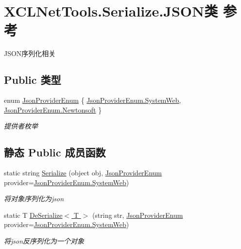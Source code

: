 \hypertarget{class_x_c_l_net_tools_1_1_serialize_1_1_j_s_o_n}{}\section{X\+C\+L\+Net\+Tools.\+Serialize.\+J\+S\+O\+N类 参考}
\label{class_x_c_l_net_tools_1_1_serialize_1_1_j_s_o_n}


J\+S\+O\+N序列化相关  


\subsection*{Public 类型}
\begin{DoxyCompactItemize}
\item 
enum \hyperlink{class_x_c_l_net_tools_1_1_serialize_1_1_j_s_o_n_acb00f7258e4dedfaa0cec15ce9335a31}{Json\+Provider\+Enum} \{ \hyperlink{class_x_c_l_net_tools_1_1_serialize_1_1_j_s_o_n_acb00f7258e4dedfaa0cec15ce9335a31a67a1b1b70420ea0e3be332a9dedcb83e}{Json\+Provider\+Enum.\+System\+Web}, 
\hyperlink{class_x_c_l_net_tools_1_1_serialize_1_1_j_s_o_n_acb00f7258e4dedfaa0cec15ce9335a31a3dae1400047ce0f8033b4d8f2815fc92}{Json\+Provider\+Enum.\+Newtonsoft}
 \}\begin{DoxyCompactList}\small\item\em 提供者枚举 \end{DoxyCompactList}
\end{DoxyCompactItemize}
\subsection*{静态 Public 成员函数}
\begin{DoxyCompactItemize}
\item 
static string \hyperlink{class_x_c_l_net_tools_1_1_serialize_1_1_j_s_o_n_aa37e98ab010f59d7454506b78ca8902e}{Serialize} (object obj, \hyperlink{class_x_c_l_net_tools_1_1_serialize_1_1_j_s_o_n_acb00f7258e4dedfaa0cec15ce9335a31}{Json\+Provider\+Enum} provider=\hyperlink{class_x_c_l_net_tools_1_1_serialize_1_1_j_s_o_n_acb00f7258e4dedfaa0cec15ce9335a31a67a1b1b70420ea0e3be332a9dedcb83e}{Json\+Provider\+Enum.\+System\+Web})
\begin{DoxyCompactList}\small\item\em 将对象序列化为json \end{DoxyCompactList}\item 
static T \hyperlink{class_x_c_l_net_tools_1_1_serialize_1_1_j_s_o_n_a9c668a657dca5eb7529d0b7b6e1845a2}{De\+Serialize$<$ T $>$} (string str, \hyperlink{class_x_c_l_net_tools_1_1_serialize_1_1_j_s_o_n_acb00f7258e4dedfaa0cec15ce9335a31}{Json\+Provider\+Enum} provider=\hyperlink{class_x_c_l_net_tools_1_1_serialize_1_1_j_s_o_n_acb00f7258e4dedfaa0cec15ce9335a31a67a1b1b70420ea0e3be332a9dedcb83e}{Json\+Provider\+Enum.\+System\+Web})
\begin{DoxyCompactList}\small\item\em 将json反序列化为一个对象 \end{DoxyCompactList}\end{DoxyCompactItemize}


